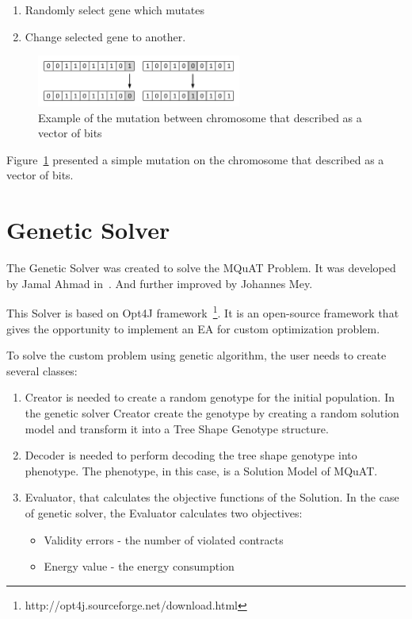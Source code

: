 \begin{enumerate}
	\item Randomly select gene which mutates
	\item Change selected gene to another.
\end{enumerate}

\begin{figure}
	\centering
	\includegraphics[width=0.6\textwidth]{images/mutationVector.pdf}
	\caption[Example of the mutation]{Example of the mutation between chromosome that described as a vector of bits}
	\label{fig:MutationVector}
\end{figure}

Figure~\ref{fig:MutationVector} presented a simple mutation on the chromosome that described as a vector of bits.




\section{Genetic Solver}\label{sec:GeneticSolver}
The Genetic Solver was created to solve the MQuAT Problem. It was developed by Jamal Ahmad in~\cite{ahmad18}. And further improved by Johannes Mey.

This Solver is based on Opt4J framework~\footnote{http://opt4j.sourceforge.net/download.html}. It is an open-source framework that gives the opportunity to implement an EA for custom optimization problem.

To solve the custom problem using genetic algorithm, the user needs to create several classes:

\begin{enumerate}
	\item Creator is needed to create a random genotype for the initial population.
	In the genetic solver Creator create the genotype by creating a random solution model and transform it into a Tree Shape Genotype structure.
	\item Decoder is needed to perform decoding the tree shape genotype into phenotype. The phenotype, in this case, is a Solution Model of MQuAT.
	\item Evaluator, that calculates the objective functions of the Solution. In the case of genetic solver, the Evaluator calculates two objectives: 
	
	\begin{itemize}
		\item Validity errors - the number of violated contracts
		\item Energy value - the energy consumption
	\end{itemize}
	
\end{enumerate}

